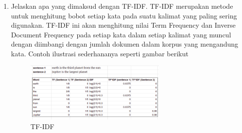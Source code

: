 \begin{enumerate}
	\item Jelaskan apa yang dimaksud dengan TF-IDF.
	\hfill\break
	TF-IDF merupakan metode untuk menghitung bobot setiap kata pada suatu kalimat yang paling sering digunakan. TF-IDF ini akan menghitung nilai Term Frequency dan Inverse Document Frequency pada setiap kata dalam setiap kalimat yang muncul dengan diimbangi dengan jumlah dokumen dalam korpus yang mengandung kata. Contoh ilustrasi sederhananya seperti gambar berikut 

	\begin{figure}[H]
	\centering
		\includegraphics[width=7cm]{figures/1174087/4/4.png}
		\caption{TF-IDF}
	\end{figure}
\end{enumerate}



